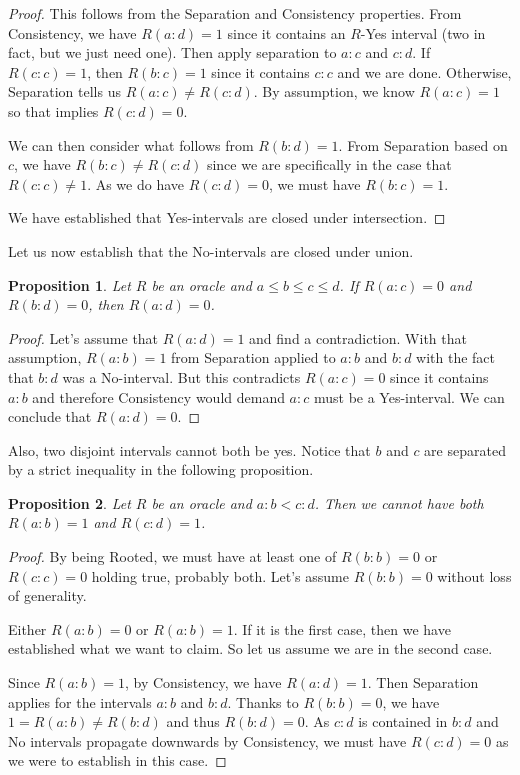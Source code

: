 \documentclass[12pt]{article}
\newtheorem{proposition}{Proposition}
\theoremstyle{remark}
\begin{document}
\begin{proof}
  
  This follows from the Separation and Consistency properties. From Consistency, we have $R(a:d) = 1$ since it contains an $R$-Yes interval (two in fact, but we just need one). Then apply separation to $a:c$ and $c:d$. If $R(c:c) = 1$, then $R(b:c) = 1$ since it contains $c:c$ and we are done. Otherwise, Separation tells us $R(a:c) \neq R(c:d)$. By assumption, we know $R(a:c) = 1$ so that implies $R(c:d) = 0$. 
  
  We can then consider what follows from $R(b:d) = 1$.  From Separation based on $c$, we have $R(b:c) \neq R(c:d)$ since we are specifically in the case that $R(c:c) \neq 1$. As we do have $R(c:d) = 0$, we must have $R(b:c) = 1$.
  
  We have established that Yes-intervals are closed under intersection. 
\end{proof}

Let us now establish that the No-intervals are closed under union. 

\begin{proposition}\label{pr:union}
Let $R$ be an oracle and $a \leq b \leq c \leq d$.  If $R(a:c) = 0$ and $R(b:d) = 0$, then $R(a:d) = 0$. 
\end{proposition}

\begin{proof}
    Let's assume that $R(a:d) = 1$ and find a contradiction. With that assumption, $R(a:b) = 1$ from Separation applied to $a:b$ and $b:d$ with the fact that $b:d$ was a No-interval. But this contradicts $R(a:c)= 0$ since it contains $a:b$ and therefore Consistency would demand $a:c$ must be a Yes-interval. We can conclude that $R(a:d) =0$.
\end{proof}

Also, two disjoint intervals cannot both be yes. Notice that $b$ and $c$ are separated by a strict inequality in the following proposition. 

\begin{proposition} \label{pr:disjoint}
Let $R$ be an oracle and $a:b < c:d$. Then we cannot have both $R(a:b) = 1$ and $R(c:d) = 1$. 
\end{proposition}

\begin{proof}
By being Rooted, we must have at least one of $R(b:b) = 0$ or $R(c:c) = 0$ holding true, probably both. Let's assume $R(b:b) = 0$ without loss of generality.
 
Either $R(a:b) = 0$ or $R(a:b)=1$. If it is the first case, then we have established what we want to claim. So let us assume we are in the second case. 
 
Since $R(a:b) = 1$,  by Consistency, we have $R(a:d) = 1$. Then Separation applies for the intervals $a:b$ and $b:d$. Thanks to $R(b:b) = 0$, we have $1 = R(a:b) \neq R(b:d)$ and thus $R(b:d) = 0$. As $c:d$ is contained in $b:d$ and No intervals propagate downwards by Consistency, we must have $R(c:d)=0$  as we were to establish in this case. 
\end{proof}
\end{document}
